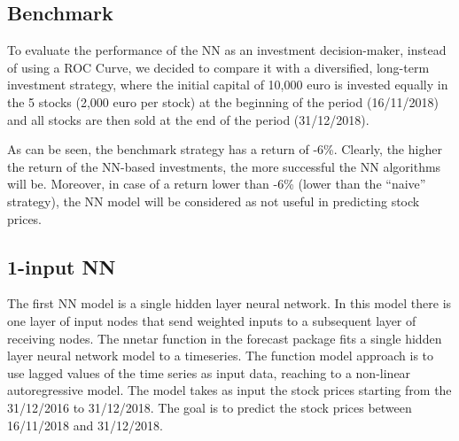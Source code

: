 \documentclass[
  11pt,
]{article}
\begin{document}
\hypertarget{benchmark}{%
\subsection{Benchmark}\label{benchmark}}

To evaluate the performance of the NN as an investment decision-maker,
instead of using a ROC Curve, we decided to compare it with a
diversified, long-term investment strategy, where the initial capital of
10,000 euro is invested equally in the 5 stocks (2,000 euro per stock)
at the beginning of the period (16/11/2018) and all stocks are then sold
at the end of the period (31/12/2018).

\begin{table}[H]

\caption{\label{tab:benchmark2}Benchmark strategy outcome}
\centering
{}
\end{table}

As can be seen, the benchmark strategy has a return of -6\%. Clearly,
the higher the return of the NN-based investments, the more successful
the NN algorithms will be. Moreover, in case of a return lower than -6\%
(lower than the ``naive'' strategy), the NN model will be considered as
not useful in predicting stock prices.

\hypertarget{input-nn}{%
\subsection{1-input NN}\label{input-nn}}

The first NN model is a single hidden layer neural network. In this
model there is one layer of input nodes that send weighted inputs to a
subsequent layer of receiving nodes. The nnetar function in the forecast
package fits a single hidden layer neural network model to a timeseries.
The function model approach is to use lagged values of the time series
as input data, reaching to a non-linear autoregressive model. The model
takes as input the stock prices starting from the 31/12/2016 to
31/12/2018. The goal is to predict the stock prices between 16/11/2018
and 31/12/2018.
\end{document}
